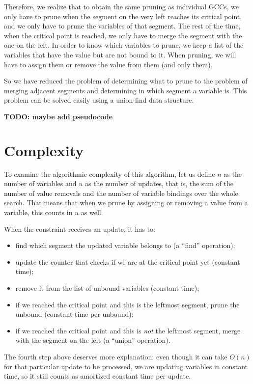 \documentclass[a4paper,10pt]{article}
\begin{document}
Therefore, we realize that to obtain the same pruning as individual GCCs, we only have to prune when the segment on the very left reaches its critical point, and we only have to prune the variables of that segment. The rest of the time, when the critical point is reached, we only have to merge the segment with the one on the left. In order to know which variables to prune, we keep a list of the variables that have the value but are not bound to it. When pruning, we will have to assign them or remove the value from them (and only them).

So we have reduced the problem of determining what to prune to the problem of merging adjacent segments and determining in which segment a variable is. This problem can be solved easily using a union-find data structure.

\textbf{TODO: maybe add pseudocode}

\section{Complexity}

To examine the algorithmic complexity of this algorithm, let us define $n$ as the number of variables and $u$ as the number of updates, that is, the sum of the number of value removals and the number of variable bindings over the whole search. That means that when we prune by assigning or removing a value from a variable, this counts in $u$ as well.

When the constraint receives an update, it has to:
\begin{itemize}
    \item find which segment the updated variable belongs to (a ``find'' operation);
    \item update the counter that checks if we are at the critical point yet (constant time);
    \item remove it from the list of unbound variables (constant time);
    \item if we reached the critical point and this is the leftmost segment, prune the unbound (constant time per unbound);
    \item if we reached the critical point and this is \emph{not} the leftmost segment, merge with the segment on the left (a ``union'' operation).
\end{itemize}

The fourth step above deserves more explanation: even though it can take $O(n)$ for that particular update to be processed, we are updating variables in constant time, so it still counts as amortized constant time per update.
\end{document}
